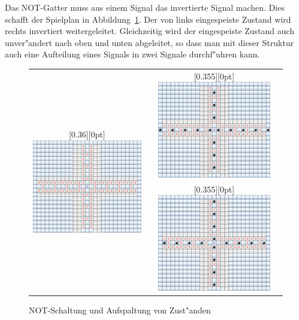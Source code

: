 Das NOT-Gatter muss aus einem Signal das invertierte Signal
machen. Dies schafft der Spielplan in Abbildung~\ref{splitter}.
Der von links eingespeiste Zustand wird rechts invertiert weitergeleitet.
Gleichzeitig wird der eingespeiste Zustand auch unver"andert nach
oben und unten abgeleitet, so dass man mit dieser Struktur auch
eine Aufteilung eines Signals in zwei Signale durchf"uhren kann.
\begin{figure}
\begin{center}
\begin{tabular}{|c|c|c|c|}
\hline
\multirow{2}{0.4\hsize}{%
\raisebox{-5ex}[0.36\hsize][0pt]{%
\includegraphics[width=\hsize]{graphics/splitter}%
}}&
\raisebox{11.5ex}{$0$}&
\raisebox{0pt}[0.355\hsize][0pt]{%
\includegraphics[width=0.4\hsize]{graphics/splitter-1}}&
\raisebox{11ex}{$1$}\\
\cline{2-4}
&
\raisebox{11.5ex}{$1$}&
\raisebox{0pt}[0.355\hsize][0pt]{%
\includegraphics[width=0.4\hsize]{graphics/splitter-0}}&
\raisebox{11ex}{$0$}\\
\hline
\end{tabular}
\end{center}
\caption{NOT-Schaltung und Aufspaltung von Zust"anden\label{splitter}}
\end{figure}%

